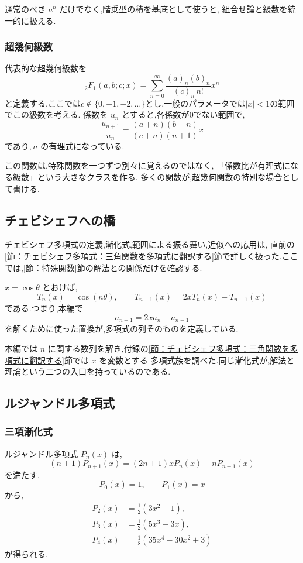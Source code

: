 通常のべき $a^n$ だけでなく,階乗型の積を基底として使うと,
組合せ論と級数を統一的に扱える.

\subsubsection{超幾何級数}

代表的な超幾何級数を
\[
  {}_2F_1(a,b;c;x)
  =
  \sum_{n=0}^{\infty}
  \frac{(a)_n(b)_n}{(c)_n\,n!}x^n
\]
と定義する.ここでは$c\notin\{0,-1,-2,\ldots\}$とし,一般のパラメータでは$|x|<1$の範囲でこの級数を考える.
係数を $u_n$ とすると,各係数が$0$でない範囲で,
\[
  \frac{u_{n+1}}{u_n}
  =
  \frac{(a+n)(b+n)}{(c+n)(n+1)}x
\]
であり,\,$n$ の有理式になっている.

この関数は,特殊関数を一つずつ別々に覚えるのではなく,
「係数比が有理式になる級数」という大きなクラスを作る.
多くの関数が,超幾何関数の特別な場合として書ける.

\subsection{チェビシェフへの橋}

チェビシェフ多項式の定義,漸化式,範囲による振る舞い,近似への応用は,
直前の\ref{節：チェビシェフ多項式：三角関数を多項式に翻訳する}節で詳しく扱った.ここでは,\ref{節：特殊関数}節の解法との関係だけを確認する.

$x=\cos\theta$ とおけば,
\[
  T_n(x)=\cos(n\theta),
  \qquad
  T_{n+1}(x)=2xT_n(x)-T_{n-1}(x)
\]
である.つまり,本編で
\[
  a_{n+1}=2x a_n-a_{n-1}
\]
を解くために使った置換が,多項式の列そのものを定義している.

本編では $n$ に関する数列を解き,付録の\ref{節：チェビシェフ多項式：三角関数を多項式に翻訳する}節では $x$ を変数とする
多項式族を調べた.同じ漸化式が,解法と理論という二つの入口を持っているのである.

\subsection{ルジャンドル多項式}

\subsubsection{三項漸化式}

ルジャンドル多項式 $P_n(x)$ は,
\[
  (n+1)P_{n+1}(x)
  =(2n+1)xP_n(x)-nP_{n-1}(x)
\]
を満たす.
\[
  P_0(x)=1,\qquad P_1(x)=x
\]
から,
\[
\begin{aligned}
  P_2(x)&=\frac12(3x^2-1),\\
  P_3(x)&=\frac12(5x^3-3x),\\
  P_4(x)&=\frac18(35x^4-30x^2+3)
\end{aligned}
\]
が得られる.

